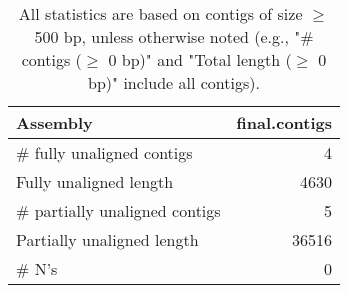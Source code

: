 \documentclass[12pt,a4paper]{article}
\begin{document}
\begin{table}[ht]
\begin{center}
\caption{All statistics are based on contigs of size $\geq$ 500 bp, unless otherwise noted (e.g., "\# contigs ($\geq$ 0 bp)" and "Total length ($\geq$ 0 bp)" include all contigs).}
\begin{tabular}{|l*{1}{|r}|}
\hline
Assembly & final.contigs \\ \hline
\# fully unaligned contigs & 4 \\ \hline
Fully unaligned length & 4630 \\ \hline
\# partially unaligned contigs & 5 \\ \hline
Partially unaligned length & 36516 \\ \hline
\# N's & 0 \\ \hline
\end{tabular}
\end{center}
\end{table}
\end{document}
